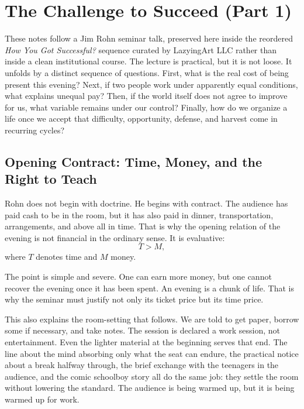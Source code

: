 \chapter{The Challenge to Succeed (Part 1)}

These notes follow a Jim Rohn seminar talk, preserved here inside the reordered \emph{How You Got Successful?} sequence curated by LazyingArt LLC rather than inside a clean institutional course. The lecture is practical, but it is not loose. It unfolds by a distinct sequence of questions. First, what is the real cost of being present this evening? Next, if two people work under apparently equal conditions, what explains unequal pay? Then, if the world itself does not agree to improve for us, what variable remains under our control? Finally, how do we organize a life once we accept that difficulty, opportunity, defense, and harvest come in recurring cycles?

\section{Opening Contract: Time, Money, and the Right to Teach}

Rohn does not begin with doctrine. He begins with contract. The audience has paid cash to be in the room, but it has also paid in dinner, transportation, arrangements, and above all in time. That is why the opening relation of the evening is not financial in the ordinary sense. It is evaluative:
\begin{equation}
T > M,
\end{equation}
where \(T\) denotes time and \(M\) money.

The point is simple and severe. One can earn more money, but one cannot recover the evening once it has been spent. An evening is a chunk of life. That is why the seminar must justify not only its ticket price but its time price.

This also explains the room-setting that follows. We are told to get paper, borrow some if necessary, and take notes. The session is declared a work session, not entertainment. Even the lighter material at the beginning serves that end. The line about the mind absorbing only what the seat can endure, the practical notice about a break halfway through, the brief exchange with the teenagers in the audience, and the comic schoolboy story all do the same job: they settle the room without lowering the standard. The audience is being warmed up, but it is being warmed up for work.

